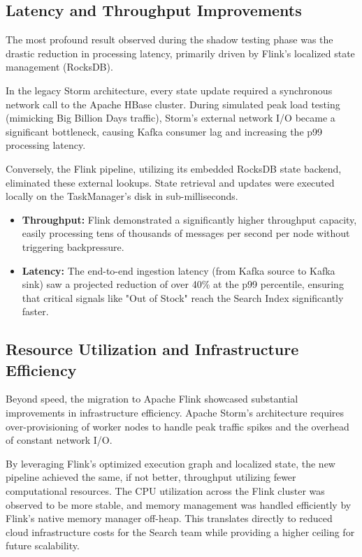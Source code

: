 \subsection{Latency and Throughput Improvements}
\begin{justify}
    The most profound result observed during the shadow testing phase was the drastic reduction in processing latency, primarily driven by Flink's localized state management (RocksDB). 
    
    In the legacy Storm architecture, every state update required a synchronous network call to the Apache HBase cluster. During simulated peak load testing (mimicking Big Billion Days traffic), Storm's external network I/O became a significant bottleneck, causing Kafka consumer lag and increasing the p99 processing latency.
    
    Conversely, the Flink pipeline, utilizing its embedded RocksDB state backend, eliminated these external lookups. State retrieval and updates were executed locally on the TaskManager's disk in sub-milliseconds. 
    
    \begin{itemize}
        \item \textbf{Throughput:} Flink demonstrated a significantly higher throughput capacity, easily processing tens of thousands of messages per second per node without triggering backpressure.
        \item \textbf{Latency:} The end-to-end ingestion latency (from Kafka source to Kafka sink) saw a projected reduction of over 40\% at the p99 percentile, ensuring that critical signals like "Out of Stock" reach the Search Index significantly faster.
    \end{itemize}
\end{justify}

\subsection{Resource Utilization and Infrastructure Efficiency}
\begin{justify}
    Beyond speed, the migration to Apache Flink showcased substantial improvements in infrastructure efficiency. Apache Storm's architecture requires over-provisioning of worker nodes to handle peak traffic spikes and the overhead of constant network I/O. 

    By leveraging Flink's optimized execution graph and localized state, the new pipeline achieved the same, if not better, throughput utilizing fewer computational resources. The CPU utilization across the Flink cluster was observed to be more stable, and memory management was handled efficiently by Flink's native memory manager off-heap. This translates directly to reduced cloud infrastructure costs for the Search team while providing a higher ceiling for future scalability.
\end{justify}

